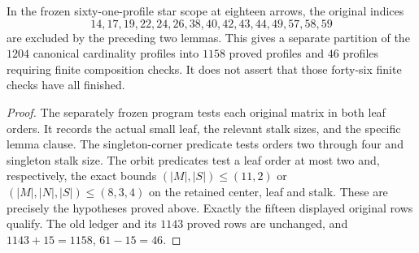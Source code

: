\begin{proposition}
\label{CP2:A-star-eighteen-small-leaf-scope}
In the frozen sixty-one-profile star scope at eighteen arrows,
the original indices
\[
14,17,19,22,24,26,38,40,42,43,44,49,57,58,59
\]
are excluded by the preceding two lemmas. This gives a separate
partition of the $1204$ canonical cardinality profiles into
$1158$ proved profiles and $46$ profiles requiring finite
composition checks. It does not assert that those forty-six
finite checks have all finished.
\end{proposition}
\begin{proof}
The separately frozen program
tests each original matrix in both leaf orders. It records
the actual small leaf, the relevant stalk sizes, and the
specific lemma clause. The singleton-corner predicate tests
orders two through four and singleton stalk size. The orbit
predicates test a leaf order at most two and, respectively,
the exact bounds $(|M|,|S|)\leq(11,2)$ or
$(|M|,|N|,|S|)\leq(8,3,4)$ on the retained center, leaf and
stalk. These are precisely the hypotheses proved above.
Exactly the fifteen displayed original rows qualify. The
old ledger and its $1143$ proved rows are unchanged, and
$1143+15=1158$, $61-15=46$.
\end{proof}
